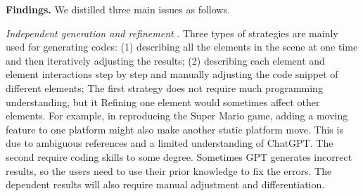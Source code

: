 

\textbf{Findings.} We distilled three main {issues} as follows. %

\emph{Independent generation and refinement }. 
{Three} types of strategies are mainly used for generating codes: (1) describing all the elements in the scene at one time and then iteratively adjusting the results; (2) describing each element and element interactions step by step and manually adjusting the code snippet of different elements;
 The first strategy does not require much programming understanding, but it  %
Refining one element would sometimes affect other elements. %
For example, in {reproducing the} %
Super Mario game, adding a moving feature to one platform might also make another static platform move. This is due to ambiguous references and a limited understanding of ChatGPT. The second  require coding skills to some degree. Sometimes GPT generates incorrect results, so the users need to use their prior knowledge to fix the errors. The dependent results will also require manual adjustment and differentiation.

